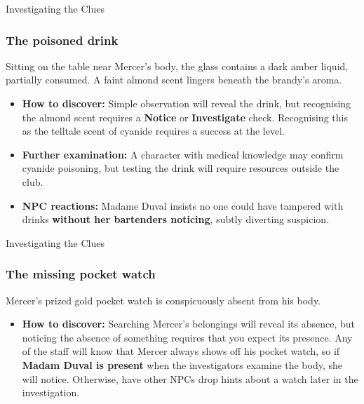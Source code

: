 \begin{CommentBox}{Investigating the Clues}
	\subsubsection*{The poisoned drink}
	Sitting on the table near Mercer's body, the glass contains a dark amber liquid, partially consumed. A faint almond scent lingers beneath the brandy's aroma.  
	\begin{itemize}
		\item \textbf{How to discover:} Simple observation will reveal the drink, but recognising the almond scent requires a \Basic \textbf{Notice} or \textbf{Investigate} check. Recognising this as the telltale scent of cyanide requires a success at the \Difficult level.
		\item \textbf{Further examination:} A character with medical knowledge may confirm cyanide poisoning, but testing the drink will require resources outside the club.
		\item \textbf{NPC reactions:} Madame Duval insists no one could have tampered with drinks \textbf{without her bartenders noticing}, subtly diverting suspicion.
	\end{itemize}
\end{CommentBox}	

\begin{CommentBox}{Investigating the Clues}
	\subsubsection*{The missing pocket watch}
	Mercer’s prized gold pocket watch is conspicuously absent from his body. 
	\begin{itemize}
		\item \textbf{How to discover:} Searching Mercer’s belongings will reveal its absence, but noticing the absence of something requires that you expect its presence. Any of the staff will know that Mercer always shows off his pocket watch, so if \textbf{Madam Duval is present} when the investigators examine the body, she will notice. Otherwise, have other NPCs drop hints about a watch later in the investigation.
	\end{itemize}
\end{CommentBox}	


\newcolumn


